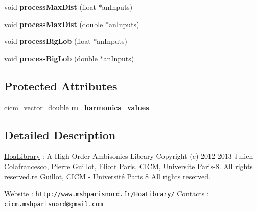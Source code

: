 \begin{DoxyCompactItemize}
\item 
\hypertarget{class_ambisonic_viewer_a3f73a0d2b78598d1f0f903041e6dc2f7}{void {\bfseries process\-Max\-Dist} (float $\ast$an\-Inputs)}\label{class_ambisonic_viewer_a3f73a0d2b78598d1f0f903041e6dc2f7}

\item 
\hypertarget{class_ambisonic_viewer_a513aa483fba06f420e6a812c7ed5d08c}{void {\bfseries process\-Max\-Dist} (double $\ast$an\-Inputs)}\label{class_ambisonic_viewer_a513aa483fba06f420e6a812c7ed5d08c}

\item 
\hypertarget{class_ambisonic_viewer_accd99213ad009b3ac7112f0ce8728e79}{void {\bfseries process\-Big\-Lob} (float $\ast$an\-Inputs)}\label{class_ambisonic_viewer_accd99213ad009b3ac7112f0ce8728e79}

\item 
\hypertarget{class_ambisonic_viewer_a10e3254f0e5188f6514e745a1e78f08d}{void {\bfseries process\-Big\-Lob} (double $\ast$an\-Inputs)}\label{class_ambisonic_viewer_a10e3254f0e5188f6514e745a1e78f08d}

\end{DoxyCompactItemize}
\subsection*{Protected Attributes}
\begin{DoxyCompactItemize}
\item 
\hypertarget{class_ambisonic_viewer_ad257853a6494a73560f6c00d15bc4f26}{cicm\-\_\-vector\-\_\-double {\bfseries m\-\_\-harmonics\-\_\-values}}\label{class_ambisonic_viewer_ad257853a6494a73560f6c00d15bc4f26}

\end{DoxyCompactItemize}


\subsection{Detailed Description}
\hyperlink{interface_hoa_library}{Hoa\-Library} \-: A High Order Ambisonics Library Copyright (c) 2012-\/2013 Julien Colafrancesco, Pierre Guillot, Eliott Paris, C\-I\-C\-M, Universite Paris-\/8. All rights reserved.\-re Guillot, C\-I\-C\-M -\/ Université Paris 8 All rights reserved.

Website \-: \href{http://www.mshparisnord.fr/HoaLibrary/}{\tt http\-://www.\-mshparisnord.\-fr/\-Hoa\-Library/} Contacts \-: \href{mailto:cicm.mshparisnord@gmail.com}{\tt cicm.\-mshparisnord@gmail.\-com}

